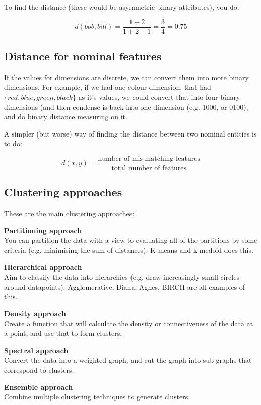 To find the distance (these would be asymmetric binary attributes), you do:

\[
  d(bob, bill) = \frac{1 + 2}{1 + 2 + 1} = \frac{3}{4} = 0.75
\]  

\subsection{Distance for nominal features}

If the values for dimensions are discrete, we can convert them into more binary
dimensions. For example, if we had one colour dimension, that had $\{red, blue,
green, black\}$ as it's values, we could convert that into four binary
dimensions (and then condense is back into one dimension (e.g. 1000, or 0100),
and do binary distance measuring on it.

A simpler (but worse) way of finding the distance between two nominal entities
is to do:

\[
  d(x,y) = \frac{\text{number of mis-matching features}}{\text{total number of features}}
\]

\subsection{Clustering approaches}

These are the main clustering approaches:

\begin{description}
  \item \textbf{Partitioning approach}\\
  You can partition the data with a view to evaluating all of the partitions by
  some criteria (e.g. minimising the sum of distances). K-means and k-medoid
  does this.

  \item \textbf{Hierarchical approach}\\
  Aim to classify the data into hierarchies (e.g. draw increasingly small circles
  around datapoints). Agglomerative, Diana, Agnes, BIRCH are all examples of
  this.

  \item \textbf{Density approach}\\
  Create a function that will calculate the density or connectiveness of the
  data at a point, and use that to form clusters.

  \item \textbf{Spectral approach}\\
  Convert the data into a weighted graph, and cut the graph into sub-graphs that
  correspond to clusters.

  \item \textbf{Ensemble approach}\\
  Combine multiple clustering techniques to generate clusters.
\end{description}

